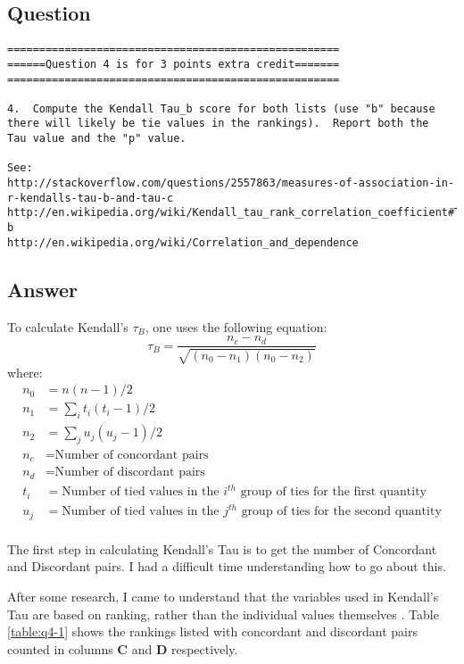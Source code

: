 \documentclass[letterpaper,11pt]{article}
\begin{document}
\subsection*{Question}

\begingroup
\fontsize{8pt}{8pt}\selectfont
\begin{verbatim}
====================================================
======Question 4 is for 3 points extra credit=======
====================================================

4.  Compute the Kendall Tau_b score for both lists (use "b" because
there will likely be tie values in the rankings).  Report both the
Tau value and the "p" value.

See: 
http://stackoverflow.com/questions/2557863/measures-of-association-in-r-kendalls-tau-b-and-tau-c
http://en.wikipedia.org/wiki/Kendall_tau_rank_correlation_coefficient#Tau-b
http://en.wikipedia.org/wiki/Correlation_and_dependence
\end{verbatim}
\endgroup

\newpage
\subsection*{Answer}

To calculate Kendall's $\tau_B$, one uses the following equation\cite{ktaubwikipedia}:
\[
\tau_B = \frac{n_c - n_d}{\sqrt{(n_0 - n_1)(n_0 - n_2)}}
\]
where:
\begin{align*}
n_0 & = n(n-1)/2 \\
n_1 & = \sum_i t_i (t_i - 1)/2 \\
n_2 & = \sum_j u_j (u_j - 1)/2 \\
n_c & = \textrm{Number of concordant pairs} \\
n_d & = \textrm{Number of discordant pairs} \\
t_i & = \textrm{Number of tied values in the $i^{th}$ group of ties for the first quantity} \\
u_j & = \textrm{Number of tied values in the $j^{th}$ group of ties for the second quantity} \\
\end{align*}

The first step in calculating Kendall's Tau is to get the number of Concordant and Discordant pairs.  I had a difficult time understanding how to go about this.

After some research, I came to understand that the variables used in Kendall's Tau are based on ranking, rather than the individual values themselves \cite{ktauyoutube1} \cite{ktauyoutube2} \cite{ktausr}.  Table \ref{table:q4-1} shows the rankings listed with concordant and discordant pairs counted in columns \textbf{C} and \textbf{D} respectively.
\end{document}
